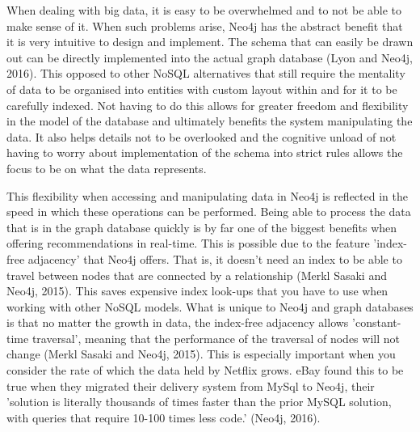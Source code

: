 \documentclass[a4paper]{article}
\begin{document}
When dealing with big data, it is easy to be overwhelmed and to not be able to make sense of it. When such problems arise, Neo4j has the abstract benefit that it is very intuitive to design and implement. The schema that can easily be drawn out can be directly implemented into the actual graph database (Lyon and Neo4j, 2016). This opposed to other NoSQL alternatives that still require the mentality of data to be organised into entities with custom layout within and for it to be carefully indexed. Not having to do this allows for greater freedom and flexibility in the model of the database and ultimately benefits the system manipulating the data. It also helps details not to be overlooked and the cognitive unload of not having to worry about implementation of the schema into strict rules allows the focus to be on what the data represents.\par

This flexibility when accessing and manipulating data in Neo4j is reflected in the speed in which these operations can be performed. Being able to process the data that is in the graph database quickly is by far one of the biggest benefits when offering recommendations in real-time. This is possible due to the feature 'index-free adjacency' that Neo4j offers. That is, it doesn't need an index to be able to travel between nodes that are connected by a relationship (Merkl Sasaki and Neo4j, 2015). This saves expensive index look-ups that you have to use when working with other NoSQL models. What is unique to Neo4j and graph databases is that no matter the growth in data, the index-free adjacency allows 'constant-time traversal', meaning that the performance of the traversal of nodes will not change (Merkl Sasaki and Neo4j, 2015). This is especially important when you consider the rate of which the data held by Netflix grows. eBay found this to be true when they migrated their delivery system from MySql to Neo4j, their 'solution is literally thousands of times faster than the prior MySQL solution, with queries that require 10-100 times less code.' (Neo4j, 2016). \par
\end{document}
